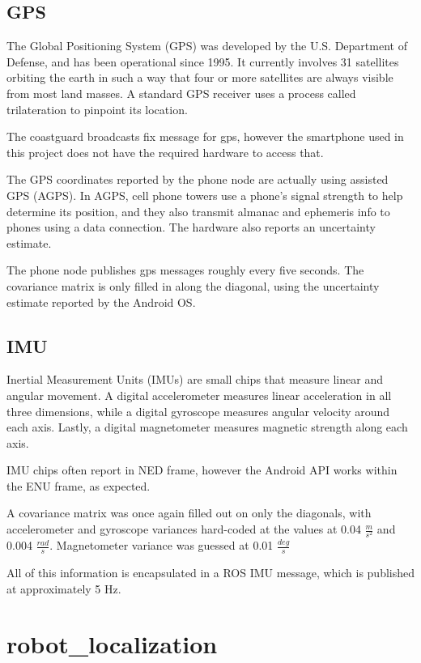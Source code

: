 \subsection{GPS}
The Global Positioning System (GPS) was developed by the U.S. Department of Defense, and has been operational since 1995. It currently involves 31 satellites orbiting the earth in such a way that four or more satellites are always visible from most land masses. A standard GPS receiver uses a process called trilateration to pinpoint its location. \cite{}

The coastguard broadcasts fix message for gps, however the smartphone used in this project does not have the required hardware to access that.

The GPS coordinates reported by the phone node are actually using assisted GPS (AGPS). In AGPS, cell phone towers use a phone's signal strength to help determine its position, and they also transmit almanac and ephemeris info to phones using a data connection. The hardware also reports an uncertainty estimate.\cite{}

The phone node publishes gps messages roughly every five seconds. The covariance matrix is only filled in along the diagonal, using the uncertainty estimate reported by the Android OS.

\subsection{IMU}

Inertial Measurement Units (IMUs) are small chips that measure linear and angular movement. A digital accelerometer measures linear acceleration in all three dimensions, while a digital gyroscope measures angular velocity around each axis. Lastly, a digital magnetometer measures magnetic strength along each axis.

IMU chips often report in NED frame, however the Android API works within the ENU frame, as expected.

A covariance matrix was once again filled out on only the diagonals, with accelerometer and gyroscope variances hard-coded at the values at 0.04 \(\frac{m}{s^2}\) and 0.004 \(\frac{rad}{s}\). \cite{Nexus4Paper}
Magnetometer variance was guessed at 0.01 \(\frac{deg}{s}\)

All of this information is encapsulated in a ROS IMU message, which is published at approximately 5 Hz. 

\section{robot\_localization} \label{sectionRobotLocalization}


